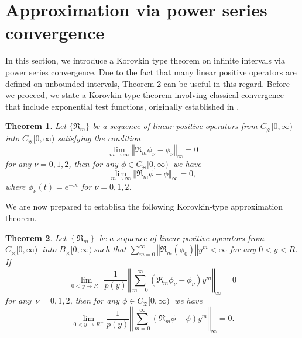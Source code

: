 \documentclass{amsart}
\newtheorem{theorem}{Theorem}
\theoremstyle{plain}
\numberwithin{equation}{section}
\begin{document}
\section{Approximation via power series convergence}\label{sec3}

In this section, we introduce a Korovkin type theorem on infinite intervals via power series convergence. Due to the fact that many
linear positive operators are defined on unbounded intervals, Theorem
\ref{theorem2} can be useful in this regard. Before we proceed, we state a Korovkin-type theorem involving classical convergence that include exponential test functions, originally established in \cite{boyanov-veselinov}.

\begin{theorem}
\label{boyanov}Let $\{ \Re_{m}\}$ be a sequence of linear positive operators
from $C_{\divideontimes}[0,\infty)$ into $C_{\divideontimes}[0,\infty)$
satisfying the condition
\[
\lim_{m\rightarrow \infty}\left \Vert \Re_{m}  \phi_{\nu}
-\phi_{\nu}\right \Vert _{\infty}=0
\]
for any $\nu=0,1,2$, then for any $\phi \in C_{\divideontimes}[0,\infty)\ $ we
have
\[
\lim_{m\rightarrow \infty}\left \Vert \Re_{m}  \phi   -\phi
\right \Vert _{\infty}=0,
\]
where $\phi_{\nu}\left(  t\right)  =e^{-\nu t}$ for $\nu=0,1,2$.
\end{theorem}

We are now prepared to establish the following Korovkin-type approximation theorem.

\begin{theorem}
\label{theorem2}Let $\left \{  \Re_{m}\right \}  $ be a sequence of linear
positive operators from $C_{\divideontimes}[0,\infty)\ $ into
$B_{\divideontimes}[0,\infty)\ $such that $%
{\displaystyle \sum \limits_{m=0}^{\infty}}
\left \Vert \Re_{m}(\phi_{0})\right \Vert y^{m}<\infty$ for any $0<y<R$. If 
\begin{equation}
\lim_{0<y\rightarrow R^{-}}\frac{1}{p(y)}\left \Vert \sum \limits_{m=0}^{\infty
}(  \Re_{m}  \phi_{\nu}  -\phi_{\nu})
y^{m}\right \Vert _{\infty}=0 \label{2a}%
\end{equation}
for any\ $\nu=0,1,2$, then for any $\phi \in C_{\divideontimes
}[0,\infty)\ $ we have
\begin{equation}
\lim_{0<y\rightarrow R^{-}}\frac{1}{p(y)}\left \Vert \sum \limits_{m=0}^{\infty
}\left(  \Re_{m}  \phi   -\phi \right)  y^{m}\right \Vert _{\infty
}=0. \label{2a1}%
\end{equation}

\end{theorem}
\end{document}
